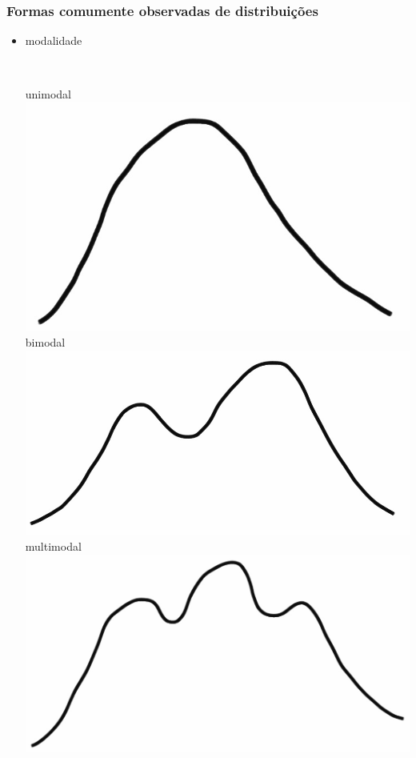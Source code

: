 \begin{frame}
\frametitle{Formas comumente observadas de distribuições}

\begin{itemize}

\item modalidade \\
$\:$ \\
\pause

\begin{columns}[c]
unimodal \\
\includegraphics[width=\textwidth]{1-6_numerical_data/unimodal.png} 
\pause
{}
bimodal \\
\includegraphics[width=\textwidth]{1-6_numerical_data/bimodal.png} 
\pause
{}
multimodal \\
\includegraphics[width=\textwidth]{1-6_numerical_data/multimodal.png} 

\end{columns}
\end{itemize}
\end{frame}
